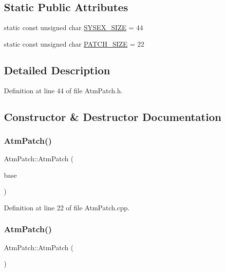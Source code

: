 \subsection*{Static Public Attributes}
\begin{DoxyCompactItemize}
\item 
static const unsigned char \hyperlink{class_atm_patch_a042c0c97fac54f61b229ad08e71037cb}{S\+Y\+S\+E\+X\+\_\+\+S\+I\+ZE} = 44
\item 
static const unsigned char \hyperlink{class_atm_patch_a1ae078abd4f165fa8b0eb14d0acd48c0}{P\+A\+T\+C\+H\+\_\+\+S\+I\+ZE} = 22
\end{DoxyCompactItemize}


\subsection{Detailed Description}


Definition at line 44 of file Atm\+Patch.\+h.



\subsection{Constructor \& Destructor Documentation}
\mbox{\label{class_atm_patch_ad9b5a85c314ca968deae87ca43b087e9}} 
\subsubsection{\texorpdfstring{Atm\+Patch()}{AtmPatch()}\hspace{0.1cm}{\footnotesize\ttfamily [1/2]}}
{\footnotesize\ttfamily Atm\+Patch\+::\+Atm\+Patch (\begin{DoxyParamCaption}\item[{\hyperlink{class_atm_patch_base}{Atm\+Patch\+Base} $\ast$}]{base }\end{DoxyParamCaption})}



Definition at line 22 of file Atm\+Patch.\+cpp.

\mbox{\label{class_atm_patch_ac9d24dbe3f01ee12145649819017f697}} 
\subsubsection{\texorpdfstring{Atm\+Patch()}{AtmPatch()}\hspace{0.1cm}{\footnotesize\ttfamily [2/2]}}
{\footnotesize\ttfamily Atm\+Patch\+::\+Atm\+Patch (\begin{DoxyParamCaption}{ }\end{DoxyParamCaption})\hspace{0.3cm}{\ttfamily [inline]}}



